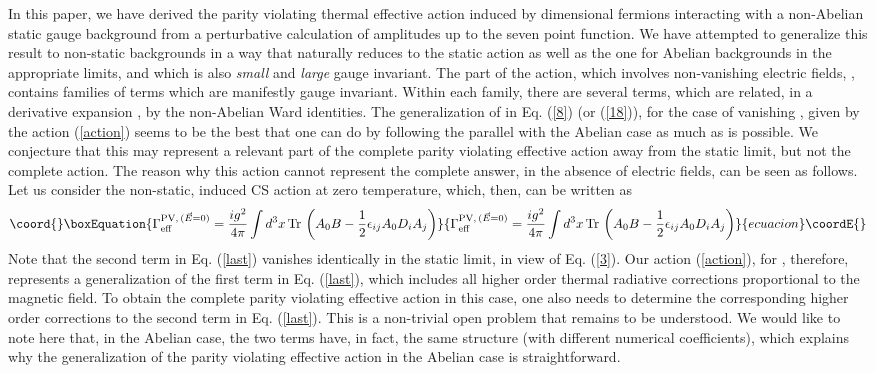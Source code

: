 \documentclass[a4paper,12pt]{article}
\begin{document}
In this paper, we have derived the parity violating thermal
effective action induced by \coordHE{} dimensional fermions interacting
with a non-Abelian static gauge background from a perturbative
calculation of amplitudes up to the seven point function. We have attempted to
generalize this result to non-static backgrounds in a way that
naturally reduces to the static action as well as the one for Abelian
backgrounds in the appropriate limits, and which is also {\it small}
and {\it large} gauge invariant. The part of the action, which
involves non-vanishing electric fields, \coordHE{} , contains families of terms which are
manifestly gauge invariant. Within each family, there are several
terms, which are related, in a derivative expansion
\cite{Aitchison:1985pp,das:1987yb}, by the non-Abelian
Ward identities. The generalization of \coordHE{} in Eq. (\ref{8}) (or (\ref{18})), for the case of
vanishing \coordHE{}, given by the
action (\ref{action}) seems to be the best that one can do by
following the parallel with the Abelian case as much as is
possible. We conjecture that this may represent a relevant part of the
complete parity violating effective action away from the static
limit, but not the complete action. The reason why this action cannot
represent  the complete answer,
in the absence of electric fields, can be seen as follows. Let us
consider the non-static, induced CS action at zero temperature, which,
then, can be written as
\begin{equation}\coord{}\boxEquation{
\Gamma_{\rm eff}^{{\rm PV},\,(\vec{E}=0)} = {ig^{2}\over 4\pi} \int
d^{3}x\,{\rm Tr}\,\left(A_{0}B - {1\over 2}
  \epsilon_{ij}A_{0}D_{i}A_{j}\right)\label{last}
}{
\Gamma_{\rm eff}^{{\rm PV},\,(\vec{E}=0)} = {ig^{2}\over 4\pi} \int
d^{3}x\,{\rm Tr}\,\left(A_{0}B - {1\over 2}
  \epsilon_{ij}A_{0}D_{i}A_{j}\right)}{ecuacion}\coordE{}\end{equation}
Note that the second term in Eq. (\ref{last}) vanishes identically in
the static limit, in view of Eq. (\ref{3}).
Our action (\ref{action}), for \coordHE{}, therefore, represents a
generalization of the first term in Eq. (\ref{last}), which includes
all higher order thermal radiative corrections proportional to the
magnetic field. To obtain the complete parity violating effective
action in this case, one also needs to determine the corresponding
higher order corrections to the second term in Eq. (\ref{last}). This
is a non-trivial open problem that remains to be understood. We would
like to note here that, in the Abelian case, the two terms have, in
fact, the same structure (with different numerical coefficients),
which  explains why the generalization of the
parity violating effective action in the Abelian case is straightforward.
\end{document}

